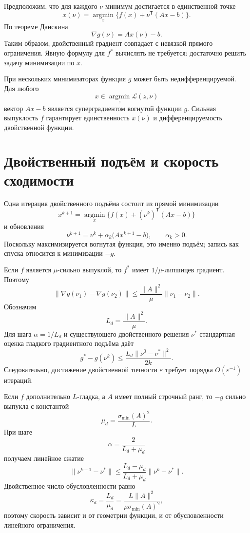 Предположим, что для каждого \(\nu\) минимум достигается в единственной
точке
\[
    x(\nu)
    =
    \operatorname*{argmin}_x
    \bigl\{f(x)+\nu^{\mathsf T}(Ax-b)\bigr\}.
\]
По теореме Данскина
\[
    \nabla g(\nu)=Ax(\nu)-b.
\]
Таким образом, двойственный градиент совпадает с невязкой прямого
ограничения. Явную формулу для \(f^*\) вычислять не требуется:
достаточно решить задачу минимизации по \(x\).

При нескольких минимизаторах функция \(g\) может быть
недифференцируемой. Для любого
\[
    x\in\operatorname*{argmin}_z\mathcal L(z,\nu)
\]
вектор \(Ax-b\) является суперградиентом вогнутой функции \(g\).
Сильная выпуклость \(f\) гарантирует единственность \(x(\nu)\) и
дифференцируемость двойственной функции.

\section{Двойственный подъём и скорость сходимости}

Одна итерация двойственного подъёма состоит из прямой минимизации
\[
    x^{k+1}
    =
    \operatorname*{argmin}_x
    \bigl\{f(x)+(\nu^k)^{\mathsf T}(Ax-b)\bigr\}
\]
и обновления
\[
    \nu^{k+1}
    =
    \nu^k+\alpha_k\bigl(Ax^{k+1}-b\bigr),
    \qquad
    \alpha_k>0.
\]
Поскольку максимизируется вогнутая функция, это именно подъём; запись
как спуска относится к минимизации \(-g\).

Если \(f\) является \(\mu\)-сильно выпуклой, то \(f^*\) имеет
\(1/\mu\)-липшицев градиент. Поэтому
\[
    \lVert\nabla g(\nu_1)-\nabla g(\nu_2)\rVert
    \le
    \frac{\lVert A\rVert^2}{\mu}
    \lVert\nu_1-\nu_2\rVert.
\]
Обозначим
\[
    L_d=\frac{\lVert A\rVert^2}{\mu}.
\]
Для шага \(\alpha=1/L_d\) и существующего двойственного решения
\(\nu^*\) стандартная оценка гладкого градиентного подъёма даёт
\[
    g^*-g(\nu^k)
    \le
    \frac{L_d\lVert\nu^0-\nu^*\rVert^2}{2k}.
\]
Следовательно, достижение двойственной точности \(\varepsilon\)
требует порядка \(O(\varepsilon^{-1})\) итераций.

Если \(f\) дополнительно \(L\)-гладка, а \(A\) имеет полный строчный
ранг, то \(-g\) сильно выпукла с константой
\[
    \mu_d
    =
    \frac{\sigma_{\min}(A)^2}{L}.
\]
При шаге
\[
    \alpha=\frac{2}{L_d+\mu_d}
\]
получаем линейное сжатие
\[
    \lVert\nu^{k+1}-\nu^*\rVert
    \le
    \frac{L_d-\mu_d}{L_d+\mu_d}
    \lVert\nu^k-\nu^*\rVert.
\]
Двойственное число обусловленности равно
\[
    \kappa_d
    =
    \frac{L_d}{\mu_d}
    =
    \frac{L\lVert A\rVert^2}
         {\mu\sigma_{\min}(A)^2},
\]
поэтому скорость зависит и от геометрии функции, и от обусловленности
линейного ограничения.

